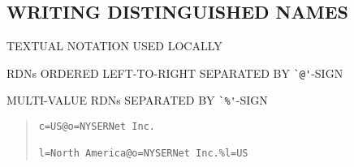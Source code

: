 \begin{bwslide}
\part*	{WRITING DISTINGUISHED NAMES}\bf

\begin{nrtc}
\item	TEXTUAL NOTATION USED LOCALLY

\item	RDNs ORDERED LEFT-TO-RIGHT SEPARATED BY \verb"`@'"-SIGN

\item	MULTI-VALUE RDNs SEPARATED BY \verb"`%'"-SIGN
\end{nrtc}
\begin{quote}\small\begin{verbatim}
c=US@o=NYSERNet Inc.

l=North America@o=NYSERNet Inc.%l=US
\end{verbatim}\end{quote}
\end{bwslide}


